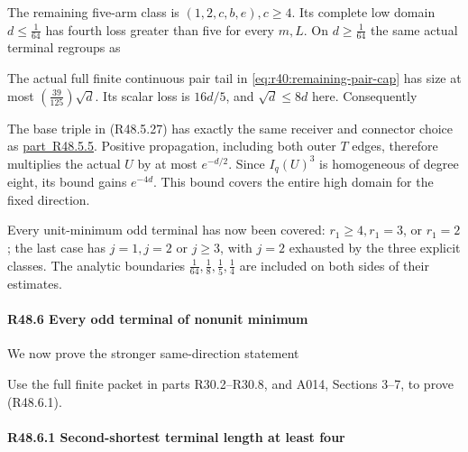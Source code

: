 The remaining five-arm class is \((1,\allowbreak \allowbreak 2,\allowbreak \allowbreak c,\allowbreak \allowbreak b,\allowbreak \allowbreak e),\allowbreak \allowbreak  c\ge 4\). Its complete low domain \(d\le \frac{1}{64}\) has fourth loss greater than five for every \(m,\allowbreak \allowbreak L\). On \(d\ge \frac{1}{64}\) the same actual terminal regroups as


The actual full finite continuous pair tail in \eqref{eq:r40:remaining-pair-cap} has size at most \((\frac{39}{125})\sqrt{d}\). Its scalar loss is \(16d/5\), and \(\sqrt{d}\le 8d\) here. Consequently


The base triple in (R48.5.27) has exactly the same receiver and connector choice as \mbox{\hyperref[part:R48.5.5]{part R48.5.5}}. Positive propagation, including both outer \(T\) edges, therefore multiplies the actual \(U\) by at most \(e^{-d/2}\). Since \(I_q(U)^3\) is homogeneous of degree eight, its bound gains \(e^{-4d}\). This bound covers the entire high domain for the fixed direction.

Every unit-minimum odd terminal has now been covered: \(r_1\ge 4,\allowbreak \allowbreak  r_1=3\), or \(r_1=2\); the last case has \(j=1,\allowbreak \allowbreak  j=2\) or \(j\ge 3\), with \(j=2\) exhausted by the three explicit classes. The analytic boundaries \(\frac{1}{64},\allowbreak \allowbreak \frac{1}{8},\allowbreak \allowbreak \frac{1}{5},\allowbreak \allowbreak \frac{1}{4}\) are included on both sides of their estimates.

\paragraph{R48.6 Every odd terminal of nonunit minimum}

We now prove the stronger same-direction statement


Use the full finite packet in parts R30.2–R30.8, and A014, Sections 3–7, to prove (R48.6.1).

\paragraph{R48.6.1 Second-shortest terminal length at least four}

